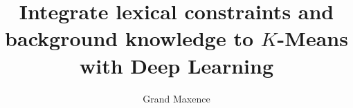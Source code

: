 \title{Integrate lexical constraints and background knowledge to $K$-Means with Deep Learning}
\author{Grand Maxence}
